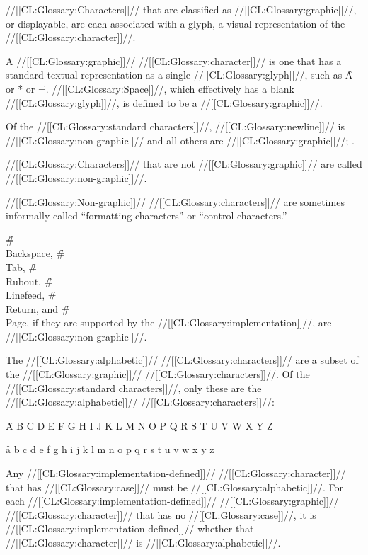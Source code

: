  

 //[[CL:Glossary:Characters]]// that are classified as //[[CL:Glossary:graphic]]//, or displayable, are each associated with a glyph, a visual representation of the //[[CL:Glossary:character]]//.

A //[[CL:Glossary:graphic]]// //[[CL:Glossary:character]]// is one that has a standard textual  representation as a single //[[CL:Glossary:glyph]]//, such as \f{A} or \f{*} or \f{=}. //[[CL:Glossary:Space]]//, which effectively has a blank //[[CL:Glossary:glyph]]//, is defined to be a //[[CL:Glossary:graphic]]//.

Of the //[[CL:Glossary:standard characters]]//,
     //[[CL:Glossary:newline]]// is //[[CL:Glossary:non-graphic]]// 
 and all others are //[[CL:Glossary:graphic]]//; \seesection\StandardChars.

 //[[CL:Glossary:Characters]]// that are not //[[CL:Glossary:graphic]]// are called //[[CL:Glossary:non-graphic]]//.

//[[CL:Glossary:Non-graphic]]// //[[CL:Glossary:characters]]// are sometimes informally called
    ``formatting characters'' 
 or ``control characters.''

\f{\#\\Backspace}, \f{\#\\Tab}, \f{\#\\Rubout}, \f{\#\\Linefeed},  \f{\#\\Return}, and \f{\#\\Page}, if they are supported by the //[[CL:Glossary:implementation]]//, are //[[CL:Glossary:non-graphic]]//.

\endsubsubsection%


The //[[CL:Glossary:alphabetic]]// //[[CL:Glossary:characters]]// are a subset of the //[[CL:Glossary:graphic]]// //[[CL:Glossary:characters]]//. Of the //[[CL:Glossary:standard characters]]//, only these are the //[[CL:Glossary:alphabetic]]// //[[CL:Glossary:characters]]//:

\f{A B C D E F G H I J K L M N O P Q R S T U V W X Y Z}

\f{a b c d e f g h i j k l m n o p q r s t u v w x y z}

Any //[[CL:Glossary:implementation-defined]]// //[[CL:Glossary:character]]// that has //[[CL:Glossary:case]]//  must be //[[CL:Glossary:alphabetic]]//. For each //[[CL:Glossary:implementation-defined]]// //[[CL:Glossary:graphic]]// //[[CL:Glossary:character]]//  that has no //[[CL:Glossary:case]]//, it is //[[CL:Glossary:implementation-defined]]// whether  that //[[CL:Glossary:character]]// is //[[CL:Glossary:alphabetic]]//.

